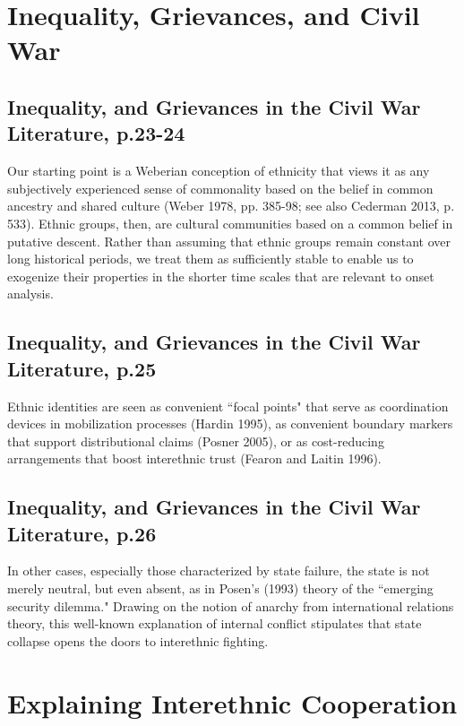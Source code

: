 \documentclass[12pt]{article}
\begin{document}
\section{Inequality, Grievances, and Civil War \citep{CedermanLars-Erik2013Igac}}

\subsection{Inequality, and Grievances in the Civil War Literature, p.23-24}

Our starting point is a Weberian conception of ethnicity that views it as any
subjectively experienced sense of commonality based on the belief in common
ancestry and shared culture (Weber 1978, pp. 385-98; see also Cederman 2013, p.
533). Ethnic groups, then, are cultural communities based on a common belief in
putative descent. Rather than assuming that ethnic groups remain constant over
long historical periods, we treat them as sufficiently stable to enable us to
exogenize their properties in the shorter time scales that are relevant to onset
analysis.

\subsection{Inequality, and Grievances in the Civil War Literature, p.25}

Ethnic identities are seen as convenient ``focal points" that serve as
coordination devices in mobilization processes (Hardin 1995), as convenient
boundary markers that support distributional claims (Posner 2005), or as
cost-reducing arrangements that boost interethnic trust (Fearon and Laitin
1996).

\subsection{Inequality, and Grievances in the Civil War Literature, p.26}

In other cases, especially those characterized by state failure, the state is
not merely neutral, but even absent, as in Posen's (1993) theory of the
``emerging security dilemma." Drawing on the notion of anarchy from
international relations theory, this well-known explanation of internal conflict
stipulates that state collapse opens the doors to interethnic fighting.

\section{Explaining Interethnic Cooperation \citep{Fearon_1996}}
\end{document}
